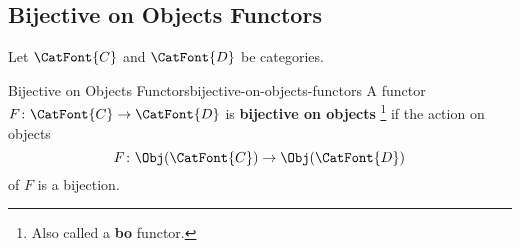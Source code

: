 \subsection{Bijective on Objects Functors}\label{subsection-bijective-on-objects-functors}
Let $\CatFont{C}$ and $\CatFont{D}$ be categories.
\begin{definition}{Bijective on Objects Functors}{bijective-on-objects-functors}%
    A functor $F\colon\CatFont{C}\to\CatFont{D}$ is \textbf{bijective on objects}%
    \footnote{%
        Also called a \textbf{bo} functor.
        \par\vspace*{\TCBBoxCorrection}
    } %
    if the action on objects
    \[
        F%
        \colon%
        \Obj(\CatFont{C})%
        \to%
        \Obj(\CatFont{D})%
    \]%
    of $F$ is a bijection.
\end{definition}
